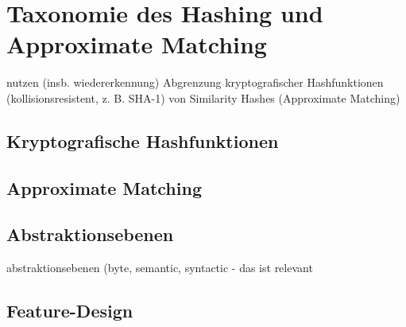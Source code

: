 \section{Taxonomie des Hashing und Approximate Matching}
nutzen (insb. wiedererkennung)
Abgrenzung kryptografischer Hashfunktionen (kollisionsresistent, z. B. SHA-1) von Similarity Hashes (Approximate Matching)

\subsection{Kryptografische Hashfunktionen}

\subsection{Approximate Matching}

\subsection{Abstraktionsebenen}
abstraktionsebenen (byte, semantic, syntactic - das ist relevant

\subsection{Feature-Design}



